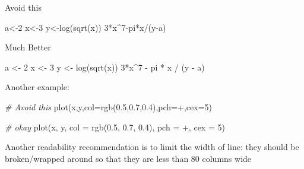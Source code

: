 \documentclass[
]{book}
\newenvironment{Shaded}{\begin{snugshade}}{\end{snugshade}}
\newcommand{\AttributeTok}[1]{\textcolor[rgb]{0.77,0.63,0.00}{#1}}
\newcommand{\CommentTok}[1]{\textcolor[rgb]{0.56,0.35,0.01}{\textit{#1}}}
\newcommand{\DecValTok}[1]{\textcolor[rgb]{0.00,0.00,0.81}{#1}}
\newcommand{\FloatTok}[1]{\textcolor[rgb]{0.00,0.00,0.81}{#1}}
\newcommand{\FunctionTok}[1]{\textcolor[rgb]{0.00,0.00,0.00}{#1}}
\newcommand{\NormalTok}[1]{#1}
\newcommand{\OtherTok}[1]{\textcolor[rgb]{0.56,0.35,0.01}{#1}}
\newcommand{\SpecialCharTok}[1]{\textcolor[rgb]{0.00,0.00,0.00}{#1}}
\newcommand{\StringTok}[1]{\textcolor[rgb]{0.31,0.60,0.02}{#1}}
\begin{document}
Avoid this

\begin{Shaded}
\begin{Highlighting}[]
\NormalTok{a}\OtherTok{\textless{}{-}}\DecValTok{2}
\NormalTok{x}\OtherTok{\textless{}{-}}\DecValTok{3}
\NormalTok{y}\OtherTok{\textless{}{-}}\FunctionTok{log}\NormalTok{(}\FunctionTok{sqrt}\NormalTok{(x))}
\DecValTok{3}\SpecialCharTok{*}\NormalTok{x}\SpecialCharTok{\^{}}\DecValTok{7}\SpecialCharTok{{-}}\NormalTok{pi}\SpecialCharTok{*}\NormalTok{x}\SpecialCharTok{/}\NormalTok{(y}\SpecialCharTok{{-}}\NormalTok{a)}
\end{Highlighting}
\end{Shaded}

Much Better

\begin{Shaded}
\begin{Highlighting}[]
\NormalTok{a }\OtherTok{\textless{}{-}} \DecValTok{2}
\NormalTok{x }\OtherTok{\textless{}{-}} \DecValTok{3}
\NormalTok{y }\OtherTok{\textless{}{-}} \FunctionTok{log}\NormalTok{(}\FunctionTok{sqrt}\NormalTok{(x))}
\DecValTok{3}\SpecialCharTok{*}\NormalTok{x}\SpecialCharTok{\^{}}\DecValTok{7} \SpecialCharTok{{-}}\NormalTok{ pi }\SpecialCharTok{*}\NormalTok{ x }\SpecialCharTok{/}\NormalTok{ (y }\SpecialCharTok{{-}}\NormalTok{ a)}
\end{Highlighting}
\end{Shaded}

Another example:

\begin{Shaded}
\begin{Highlighting}[]
\CommentTok{\# Avoid this}
\FunctionTok{plot}\NormalTok{(x,y,}\AttributeTok{col=}\FunctionTok{rgb}\NormalTok{(}\FloatTok{0.5}\NormalTok{,}\FloatTok{0.7}\NormalTok{,}\FloatTok{0.4}\NormalTok{),}\AttributeTok{pch=}\StringTok{\textquotesingle{}+\textquotesingle{}}\NormalTok{,}\AttributeTok{cex=}\DecValTok{5}\NormalTok{)}

\CommentTok{\# okay}
\FunctionTok{plot}\NormalTok{(x, y, }\AttributeTok{col =} \FunctionTok{rgb}\NormalTok{(}\FloatTok{0.5}\NormalTok{, }\FloatTok{0.7}\NormalTok{, }\FloatTok{0.4}\NormalTok{), }\AttributeTok{pch =} \StringTok{\textquotesingle{}+\textquotesingle{}}\NormalTok{, }\AttributeTok{cex =} \DecValTok{5}\NormalTok{)}
\end{Highlighting}
\end{Shaded}

Another readability recommendation is to limit the width of line: they should
be broken/wrapped around so that they are less than 80 columns wide
\end{document}
